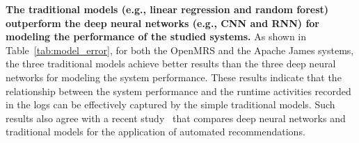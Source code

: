 
\noindent\textbf{The traditional models (e.g., linear regression and random forest) outperform the deep neural networks (e.g., CNN and RNN) for modeling the performance of the studied systems.}
As shown in Table~\ref{tab:model_error}, for both the OpenMRS and the Apache James systems, the three traditional models achieve better results than the three deep neural networks for modeling the system performance.
These results indicate that the relationship between the system performance and the runtime activities recorded in the logs can be effectively captured by the simple traditional models.
Such results also agree with a recent study~\cite{DacremaArxiv2019} that compares deep neural networks and traditional models for the application of automated recommendations.


